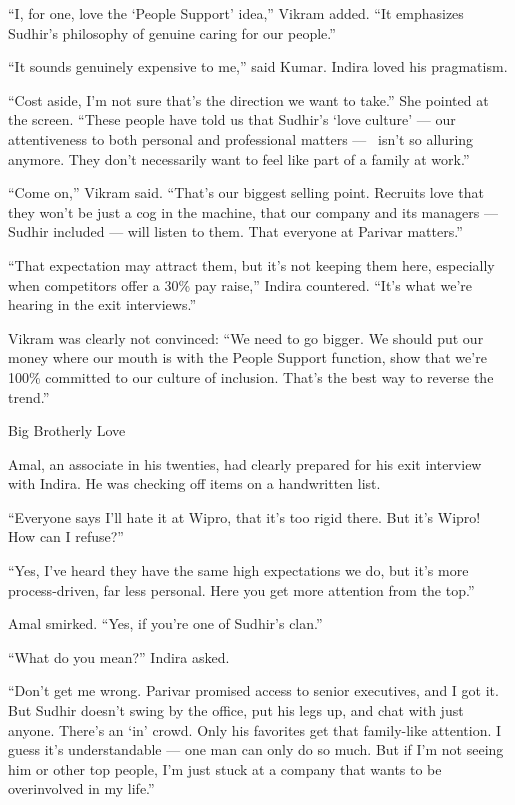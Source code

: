 \documentclass[10pt,a4paper]{book}
\begin{document}
\begin{multicols}{3}
{“I, for one, love the ‘People Support’ idea,” Vikram added. “It emphasizes Sudhir’s philosophy of genuine caring for our people.”

“It sounds genuinely expensive to me,” said Kumar. Indira loved his pragmatism.

“Cost aside, I’m not sure that’s the direction we want to take.” She pointed at the screen. “These people have told us that Sudhir’s ‘love culture’ — our attentiveness to both personal and professional matters —  isn’t so alluring anymore. They don’t necessarily want to feel like part of a family at work.”

“Come on,” Vikram said. “That’s our biggest selling point. Recruits love that they won’t be just a cog in the machine, that our company and its managers — Sudhir included — will listen to them. That everyone at Parivar matters.”

“That expectation may attract them, but it’s not keeping them here, especially when competitors offer a 30\% pay raise,” Indira countered. “It’s what we’re hearing in the exit interviews.”

Vikram was clearly not convinced: “We need to go bigger. We should put our money where our mouth is with the People Support function, show that we’re 100\% committed to our culture of inclusion. That’s the best way to reverse the trend.”

Big Brotherly Love

Amal, an associate in his twenties, had clearly prepared for his exit interview with Indira. He was checking off items on a handwritten list.

“Everyone says I’ll hate it at Wipro, that it’s too rigid there. But it’s Wipro! How can I refuse?”

“Yes, I’ve heard they have the same high expectations we do, but it’s more process-driven, far less personal. Here you get more attention from the top.”

Amal smirked. “Yes, if you’re one of Sudhir’s clan.”

“What do you mean?” Indira asked.

“Don’t get me wrong. Parivar promised access to senior executives, and I got it. But Sudhir doesn’t swing by the office, put his legs up, and chat with just anyone. There’s an ‘in’ crowd. Only his favorites get that family-like attention. I guess it’s understandable — one man can only do so much. But if I’m not seeing him or other top people, I’m just stuck at a company that wants to be overinvolved in my life.”

}
\end{multicols}
\end{document}
